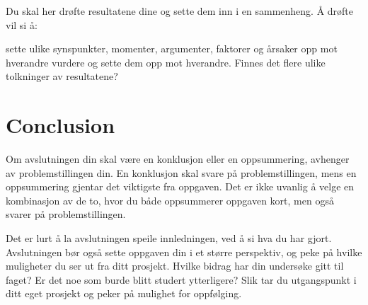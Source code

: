 \documentclass{article}
\begin{document}
Du skal her drøfte resultatene dine og sette dem inn i en sammenheng. Å drøfte vil si å:

sette ulike synspunkter, momenter, argumenter, faktorer og årsaker opp mot hverandre
vurdere og sette dem opp mot hverandre. Finnes det flere ulike tolkninger av resultatene?

\section{Conclusion}

Om avslutningen din skal være en konklusjon eller en oppsummering, avhenger av problemstillingen din. En konklusjon skal svare på problemstillingen, mens en oppsummering gjentar det viktigste fra oppgaven. Det er ikke uvanlig å velge en kombinasjon av de to, hvor du både oppsummerer oppgaven kort, men også svarer på problemstillingen.

Det er lurt å la avslutningen speile innledningen, ved å si hva du har gjort. Avslutningen bør også sette oppgaven din i et større perspektiv, og peke på hvilke muligheter du ser ut fra ditt prosjekt. Hvilke bidrag har din undersøke gitt til faget? Er det noe som burde blitt studert ytterligere? Slik tar du utgangspunkt i ditt eget prosjekt og peker på mulighet for oppfølging.
\end{document}
